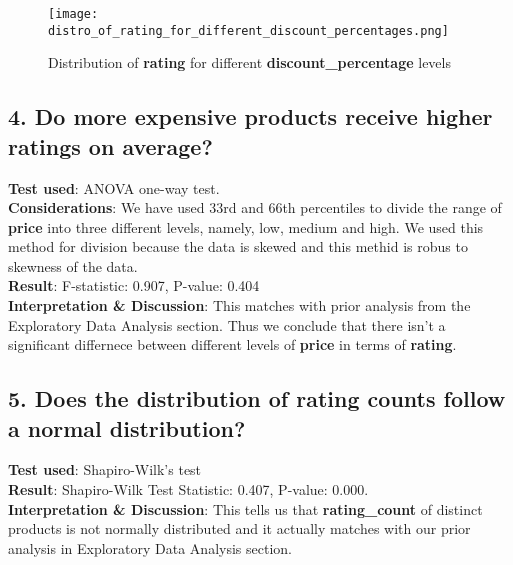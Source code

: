 \documentclass[a4paper,12pt]{article}
\begin{document}
\begin{figure}[H]
    \centering
    \texttt{[image: distro\_of\_rating\_for\_different\_discount\_percentages.png]} %
    \caption{Distribution of \textbf{rating} for different \textbf{discount\_percentage} levels}
    \label{fig:Figure_8}
\end{figure}

\subsection*{4. Do more expensive products receive higher ratings on average?}

\noindent\textbf{Test used}: ANOVA one-way test. \\ 

\noindent\textbf{Considerations}: We have used 33rd and 66th percentiles to divide the range of \textbf{price} into three different levels, namely, low, medium and high. We used this method for division because the data is skewed and this methid is robus to skewness of the data. \\ 

\noindent\textbf{Result}: F-statistic: 0.907, P-value: 0.404 \\ 

\noindent\textbf{Interpretation \& Discussion}: This matches with prior analysis from the Exploratory Data Analysis section. Thus we conclude that there isn't a significant differnece between different levels of \textbf{price} in terms of \textbf{rating}. \\ 

\subsection*{5. Does the distribution of rating counts follow a normal distribution?}

\noindent\textbf{Test used}: Shapiro-Wilk's test \\ 

\noindent\textbf{Result}: Shapiro-Wilk Test Statistic: 0.407, P-value: 0.000. \\ 

\noindent\textbf{Interpretation \& Discussion}: This tells us that \textbf{rating\_count} of distinct products is not normally distributed and it actually matches with our prior analysis in Exploratory Data Analysis section.\\ 

\end{document}
